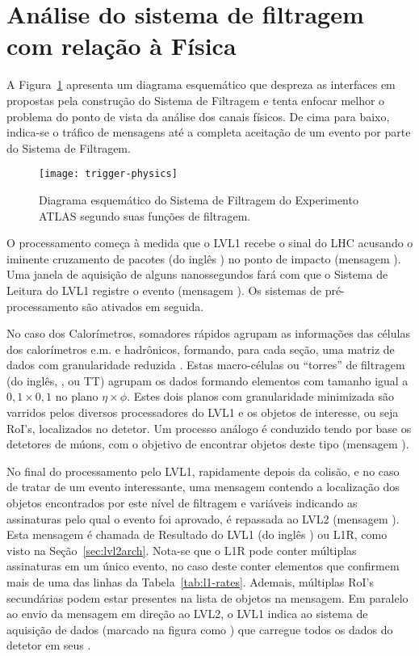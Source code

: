 \section{Análise do sistema de filtragem com relação à Física}

A Figura~\ref{fig:trigger-physics} apresenta um diagrama esquemático que
despreza as interfaces em  propostas pela construção do Sistema
de Filtragem e tenta enfocar melhor o problema do ponto de vista da análise
dos canais físicos. De cima para baixo, indica-se o tráfico de mensagens até a
completa aceitação de um evento por parte do Sistema de Filtragem.

\begin{figure}
\begin{center}
\texttt{[image: trigger-physics]}
\end{center}
\caption{Diagrama esquemático do Sistema de Filtragem do Experimento ATLAS
segundo suas funções de filtragem.}
\label{fig:trigger-physics}
\end{figure}

O processamento começa à medida que o LVL1 recebe o sinal do LHC acusando o
iminente cruzamento de pacotes (do inglês ) no ponto de
impacto (mensagem ). Uma janela de aquisição de alguns nanossegundos
fará com que o Sistema de Leitura do LVL1 registre o evento (mensagem
). Os sistemas de pré-processamento são ativados em seguida.

No caso dos Calorímetros, somadores rápidos \cite{seixas:adder} agrupam as
informações das células dos calorímetros e.m. e hadrônicos, formando, para
cada seção, uma matriz de dados com granularidade reduzida
\cite{l1-tdr}. Estas macro-células ou ``torres'' de filtragem (do inglês,
, ou TT) agrupam os dados formando elementos com tamanho
igual a $0,1\times0,1$ no plano $\eta\times\phi$. Estes dois planos com
granularidade minimizada são varridos pelos diversos processadores do LVL1 e
os objetos de interesse, ou seja RoI's, localizados no detetor. Um processo
análogo é conduzido tendo por base os detetores de múons, com o objetivo de
encontrar objetos deste tipo (mensagem ).

No final do processamento pelo LVL1, rapidamente depois da colisão, e no caso
de tratar de um evento interessante, uma mensagem contendo a localização dos
objetos encontrados por este nível de filtragem e variáveis indicando as
assinaturas pelo qual o evento foi aprovado, é repassada ao LVL2
(mensagem ). Esta mensagem é chamada de Resultado do LVL1 (do inglês
) ou L1R, como visto na Seção~\ref{sec:lvl2arch}. Nota-se que
o L1R pode conter múltiplas assinaturas em um único evento, no caso deste
conter elementos que confirmem mais de uma das linhas da
Tabela~\ref{tab:l1-rates}. Ademais, múltiplas RoI's secundárias podem estar
presentes na lista de objetos na mensagem. Em paralelo ao envio da mensagem em
direção ao LVL2, o LVL1 indica ao sistema de aquisição de dados (marcado na
figura como ) que carregue todos os dados do detetor em seus
.

